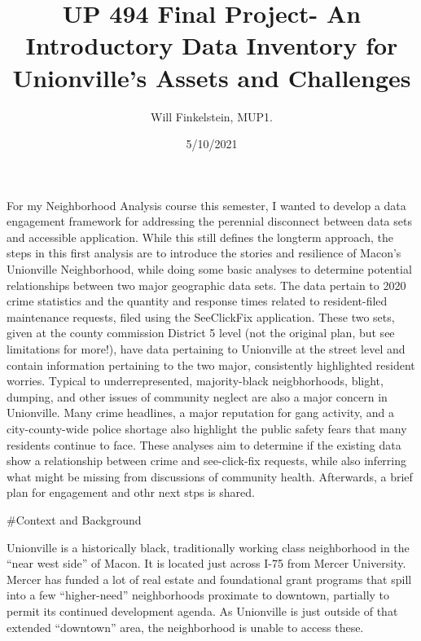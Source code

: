 \documentclass[
]{article}
\title{UP 494 Final Project- An Introductory Data Inventory for
Unionville's Assets and Challenges}
\author{Will Finkelstein, MUP1.}
\date{5/10/2021}
\begin{document}
\maketitle

{
\setcounter{tocdepth}{2}
\tableofcontents
}
For my Neighborhood Analysis course this semester, I wanted to develop a
data engagement framework for addressing the perennial disconnect
between data sets and accessible application. While this still defines
the longterm approach, the steps in this first analysis are to introduce
the stories and resilience of Macon's Unionville Neighborhood, while
doing some basic analyses to determine potential relationships between
two major geographic data sets. The data pertain to 2020 crime
statistics and the quantity and response times related to resident-filed
maintenance requests, filed using the SeeClickFix application. These two
sets, given at the county commission District 5 level (not the original
plan, but see limitations for more!), have data pertaining to Unionville
at the street level and contain information pertaining to the two major,
consistently highlighted resident worries. Typical to underrepresented,
majority-black neigbhorhoods, blight, dumping, and other issues of
community neglect are also a major concern in Unionville. Many crime
headlines, a major reputation for gang activity, and a city-county-wide
police shortage also highlight the public safety fears that many
residents continue to face. These analyses aim to determine if the
existing data show a relationship between crime and see-click-fix
requests, while also inferring what might be missing from discussions of
community health. Afterwards, a brief plan for engagement and othr next
stps is shared.

\#Context and Background

Unionville is a historically black, traditionally working class
neighborhood in the ``near west side'' of Macon. It is located just
across I-75 from Mercer University. Mercer has funded a lot of real
estate and foundational grant programs that spill into a few
``higher-need'' neighborhoods proximate to downtown, partially to permit
its continued development agenda. As Unionville is just outside of that
extended ``downtown'' area, the neighborhood is unable to access these.
\end{document}
